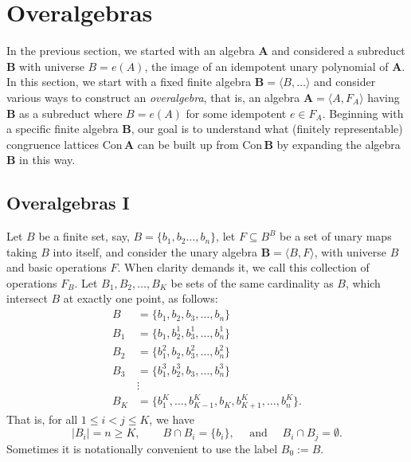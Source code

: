 \documentclass[cm,dissertation]{uhthesis}
\theoremstyle{plain}
\theoremstyle{definition}
\theoremstyle{remark}
\numberwithin{theorem}{section}
\numberwithin{claim}{chapter}
\numberwithin{equation}{section}
\numberwithin{conjecture}{chapter}
\newcommand{\<}{\ensuremath{\langle}}
\renewcommand{\>}{\ensuremath{\rangle}}
\renewcommand{\leq}{\ensuremath{\leqslant}}
\renewcommand{\geq}{\ensuremath{\geqslant}}
\newcommand{\Con}{\ensuremath{\mathrm{Con\,}}}
\newcommand{\0}{\ensuremath{\mathbf{0}}}
\newcommand{\1}{\ensuremath{\mathbf{1}}}
\newcommand{\2}{\ensuremath{\mathbf{2}}}
\newcommand{\3}{\ensuremath{\mathbf{3}}}
\newcommand{\4}{\ensuremath{\mathbf{4}}}
\newcommand{\5}{\ensuremath{\mathbf{5}}}
\newcommand{\bA}{\ensuremath{\mathbf{A}}}
\newcommand{\bB}{\ensuremath{\mathbf{B}}}
\begin{document}
\section{Overalgebras}
\label{sec:overalgebras}
In the previous section, we started with an algebra $\bA$ and
considered a subreduct $\bB$ with universe $B = e(A)$, the image of an
idempotent unary polynomial of $\bA$.  In this section, we start with a
fixed finite algebra $\bB = \<B, \dots \>$ and consider various ways to
construct an \emph{overalgebra}, that is, an algebra $\bA= \<A, F_A\>$ having 
$\bB$ as a subreduct where $B = e(A)$ for some idempotent $e \in F_A$.  
Beginning with a specific finite algebra $\bB$, our goal is to understand what
(finitely representable) congruence lattices $\Con\bA$ can be built up from
$\Con\bB$ by expanding the algebra $\bB$ in this way.

\subsection{Overalgebras I}
\label{sec:overalgebras-i}
Let $B$ be a finite set, say, $B = \{b_1, b_2\dots, b_n\}$, let $F\subseteq B^B$
be a set of unary maps taking $B$ into itself, and consider the unary algebra
$\bB = \<B, F\>$, with universe $B$ and basic operations $F$. 
When clarity demands it, we call this collection of operations $F_B$.
Let $B_1, B_2, \dots, B_{K}$ be sets of
the same cardinality as $B$, which intersect $B$ at exactly one point, as follows:
\begin{align}
  \label{eq:OABB}
  B &= \{b_1, b_2, b_3, \dots, b_{n}\}\nonumber\\
  B_1 &= \{b_1, b^1_2,  b^1_3, \dots, b^1_{n}\}\nonumber\\
  B_2 &=  \{b^2_1, b_2,  b^2_3, \dots, b^2_{n}\}\nonumber\\
  B_3 &=  \{b^3_1, b^3_2,  b_3, \dots, b^3_{n}\}\nonumber\\
  & \vdots\\
  B_{K} &= \{b^K_1, \dots, b^K_{K-1},b_K, b^K_{K+1},\dots, b^K_{n}\}.\nonumber
\end{align}
That is, for all $1 \leq i < j \leq K$, we have
\[
|B_i| = n \geq K, \qquad B\cap B_i = \{b_i\}, \quad \text{ and } \quad B_i \cap B_j = \emptyset.
\]
Sometimes it is notationally convenient to use the label $B_0:=B$. %
\end{document}
